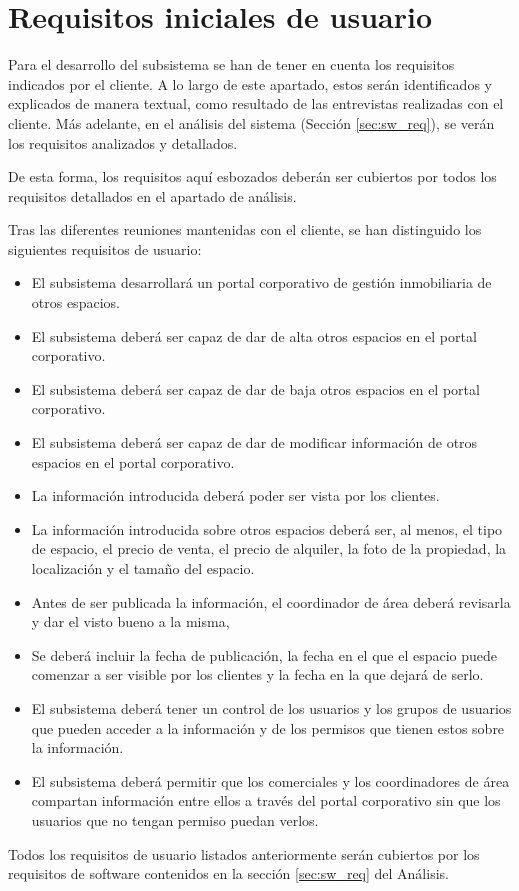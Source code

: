 \chapter{Requisitos iniciales de usuario}\label{sec:user_req}
\par Para el desarrollo del subsistema se han de tener en cuenta los requisitos indicados por el cliente. A lo largo de este apartado, estos serán identificados y explicados de manera textual, como resultado de las entrevistas realizadas con el cliente. Más adelante, en el análisis del sistema (Sección \ref{sec:sw_req}), se verán los requisitos analizados y detallados.

\par De esta forma, los requisitos aquí esbozados deberán ser cubiertos por todos los requisitos detallados en el apartado de análisis.

\par Tras las diferentes reuniones mantenidas con el cliente, se han distinguido los siguientes requisitos de usuario:


\begin{itemize}[-]
    \item El subsistema desarrollará un portal corporativo de gestión inmobiliaria de otros espacios.
    \item El subsistema deberá ser capaz de dar de alta otros espacios en el portal corporativo.
    \item El subsistema deberá ser capaz de dar de baja otros espacios en el portal corporativo.
    \item El subsistema deberá ser capaz de dar de modificar información de otros espacios en el portal corporativo.
    \item La información introducida deberá poder ser vista por los clientes.
    \item La información introducida sobre otros espacios deberá ser, al menos, el tipo de espacio, el precio de venta, el  precio de alquiler, la foto de la propiedad, la localización y el tamaño del espacio.
    \item Antes de ser publicada la información, el coordinador de área deberá revisarla y dar el visto bueno a la misma,
    \item Se deberá incluir la fecha de publicación, la fecha en el que el espacio puede comenzar a ser visible por los clientes y la fecha en la que dejará de serlo.
    \item El subsistema deberá tener un control de los usuarios y los grupos de usuarios que pueden acceder a la información y de los permisos que tienen estos sobre la información.
    \item El subsistema deberá permitir que los comerciales y los coordinadores de área compartan información entre ellos a través del portal corporativo sin que los usuarios que no tengan permiso puedan verlos.
\end{itemize}

\par Todos los requisitos de usuario listados anteriormente serán cubiertos por los requisitos de software contenidos en la sección \ref{sec:sw_req} del Análisis.
